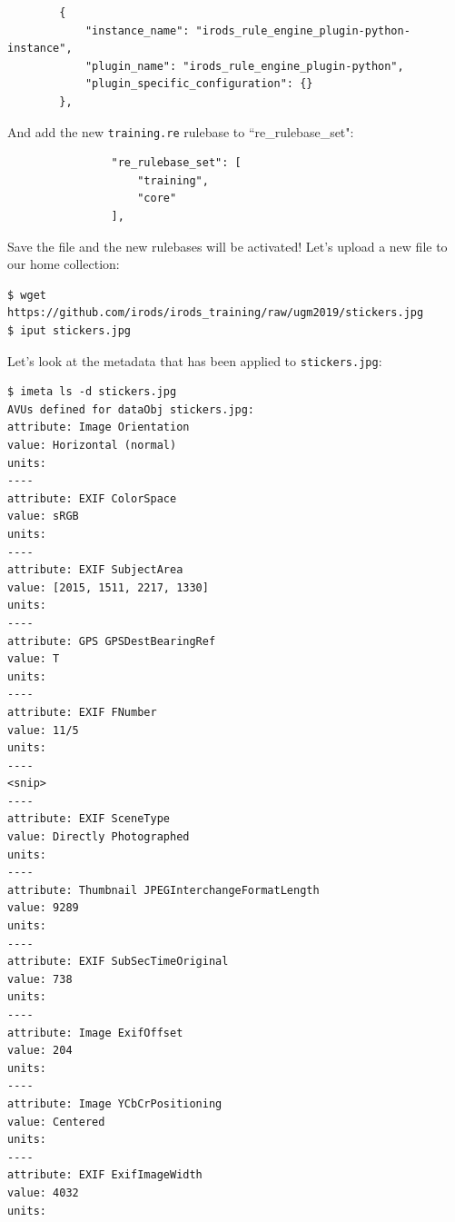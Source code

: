 \documentclass[10pt,oneside]{memoir}
\begin{document}
\begin{lrbox}{\lstServerConfigA}
\begin{lstlisting}
        {
            "instance_name": "irods_rule_engine_plugin-python-instance",
            "plugin_name": "irods_rule_engine_plugin-python",
            "plugin_specific_configuration": {}
        },
\end{lstlisting}
\end{lrbox}
\href{https://github.com/irods/irods_training/blob/ugm2019/beginner/server_config.json#L41-L45}{\usebox{\lstServerConfigA}}

And add the new \texttt{training.re} rulebase to ``re\_rulebase\_set":

\begin{lrbox}{\lstServerConfigB}
\begin{lstlisting}
                "re_rulebase_set": [
                    "training",
                    "core"
                ],
\end{lstlisting}
\end{lrbox}
\href{https://github.com/irods/irods_training/blob/ugm2019/beginner/server_config.json#L78-L80}{\usebox{\lstServerConfigB}}

Save the file and the new rulebases will be activated!  Let's upload a new file to our home collection:

\begin{lstlisting}
$ wget https://github.com/irods/irods_training/raw/ugm2019/stickers.jpg
$ iput stickers.jpg
\end{lstlisting}

\newpage

Let's look at the metadata that has been applied to \texttt{stickers.jpg}:

\begin{lstlisting}
$ imeta ls -d stickers.jpg
AVUs defined for dataObj stickers.jpg:
attribute: Image Orientation
value: Horizontal (normal)
units:
----
attribute: EXIF ColorSpace
value: sRGB
units:
----
attribute: EXIF SubjectArea
value: [2015, 1511, 2217, 1330]
units:
----
attribute: GPS GPSDestBearingRef
value: T
units:
----
attribute: EXIF FNumber
value: 11/5
units:
----
<snip>
----
attribute: EXIF SceneType
value: Directly Photographed
units:
----
attribute: Thumbnail JPEGInterchangeFormatLength
value: 9289
units:
----
attribute: EXIF SubSecTimeOriginal
value: 738
units:
----
attribute: Image ExifOffset
value: 204
units:
----
attribute: Image YCbCrPositioning
value: Centered
units:
----
attribute: EXIF ExifImageWidth
value: 4032
units:
\end{lstlisting}
\end{document}
